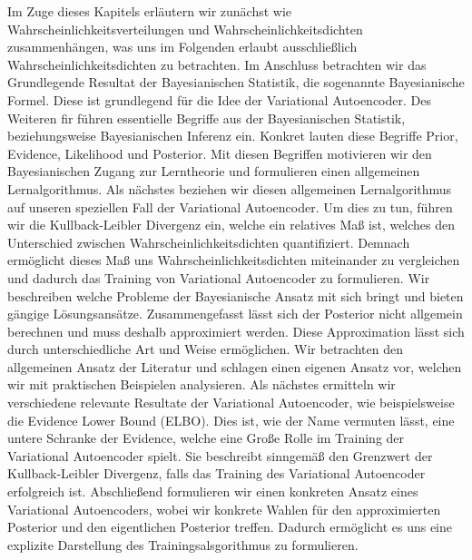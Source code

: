 \documentclass[11pt, twoside, a4paper]{book}
\theoremstyle{plain}
\theoremstyle{definition}
\theoremstyle{plain}
\begin{document}
Im Zuge dieses Kapitels erläutern wir zunächst wie Wahrscheinlichkeitsverteilungen und Wahrscheinlichkeitsdichten zusammenhängen, was uns im Folgenden erlaubt ausschließlich Wahrscheinlichkeitsdichten zu betrachten. Im Anschluss betrachten wir das Grundlegende Resultat der Bayesianischen Statistik, die sogenannte \glqq Bayesianische Formel\grqq{}. Diese ist grundlegend für die Idee der Variational Autoencoder. Des Weiteren fir führen essentielle Begriffe aus der Bayesianischen Statistik, beziehungsweise Bayesianischen Inferenz ein. Konkret lauten diese Begriffe \glqq Prior\grqq{}, \glqq Evidence\grqq{}, \glqq Likelihood\grqq{} und \glqq Posterior\grqq{}. Mit diesen Begriffen motivieren wir den Bayesianischen Zugang zur Lerntheorie und formulieren einen allgemeinen Lernalgorithmus. Als nächstes beziehen wir diesen allgemeinen Lernalgorithmus auf unseren speziellen Fall der Variational Autoencoder. Um dies zu tun, führen wir die Kullback-Leibler Divergenz ein, welche ein relatives Maß ist, welches den Unterschied zwischen Wahrscheinlichkeitsdichten quantifiziert. Demnach ermöglicht dieses Maß uns Wahrscheinlichkeitsdichten miteinander zu vergleichen und dadurch das Training von Variational Autoencoder zu formulieren. Wir beschreiben welche Probleme der Bayesianische Ansatz mit sich bringt und bieten gängige Lösungsansätze. Zusammengefasst lässt sich der Posterior nicht allgemein berechnen und muss deshalb approximiert werden. Diese Approximation lässt sich durch unterschiedliche Art und Weise ermöglichen. Wir betrachten den allgemeinen Ansatz der Literatur und schlagen einen eigenen Ansatz vor, welchen wir mit praktischen Beispielen analysieren.
Als nächstes ermitteln wir verschiedene relevante Resultate der Variational Autoencoder, wie beispielsweise die \glqq Evidence Lower Bound\grqq{} (ELBO). Dies ist, wie der Name vermuten lässt, eine untere Schranke der Evidence, welche eine Große Rolle im Training der Variational Autoencoder spielt. Sie beschreibt sinngemäß den Grenzwert der Kullback-Leibler Divergenz, falls das Training des Variational Autoencoder erfolgreich ist. Abschließend formulieren wir einen konkreten Ansatz eines Variational Autoencoders, wobei wir konkrete Wahlen für den approximierten Posterior und den eigentlichen Posterior treffen. Dadurch ermöglicht es uns eine explizite Darstellung des Trainingsalsgorithmus zu formulieren.
\end{document}
